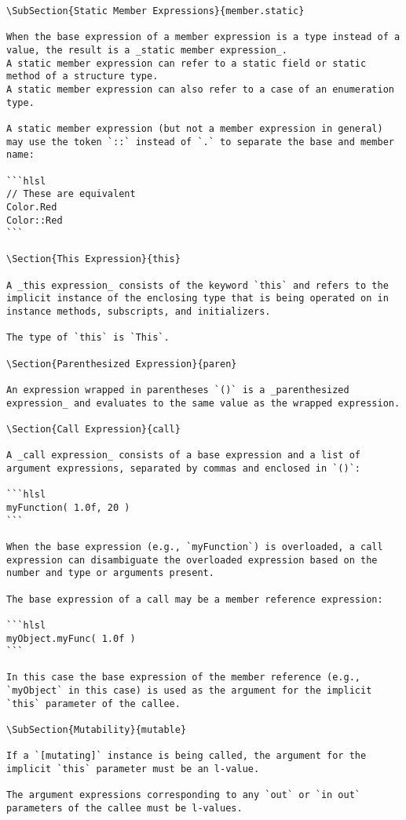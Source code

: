 \begin{verbatim}
\SubSection{Static Member Expressions}{member.static}

When the base expression of a member expression is a type instead of a value, the result is a _static member expression_.
A static member expression can refer to a static field or static method of a structure type.
A static member expression can also refer to a case of an enumeration type.

A static member expression (but not a member expression in general) may use the token `::` instead of `.` to separate the base and member name:

```hlsl
// These are equivalent
Color.Red
Color::Red
```

\Section{This Expression}{this}

A _this expression_ consists of the keyword `this` and refers to the implicit instance of the enclosing type that is being operated on in instance methods, subscripts, and initializers.

The type of `this` is `This`.

\Section{Parenthesized Expression}{paren}

An expression wrapped in parentheses `()` is a _parenthesized expression_ and evaluates to the same value as the wrapped expression.

\Section{Call Expression}{call}

A _call expression_ consists of a base expression and a list of argument expressions, separated by commas and enclosed in `()`:

```hlsl
myFunction( 1.0f, 20 )
```

When the base expression (e.g., `myFunction`) is overloaded, a call expression can disambiguate the overloaded expression based on the number and type or arguments present.

The base expression of a call may be a member reference expression:

```hlsl
myObject.myFunc( 1.0f )
```

In this case the base expression of the member reference (e.g., `myObject` in this case) is used as the argument for the implicit `this` parameter of the callee.

\SubSection{Mutability}{mutable}

If a `[mutating]` instance is being called, the argument for the implicit `this` parameter must be an l-value.

The argument expressions corresponding to any `out` or `in out` parameters of the callee must be l-values.


\end{verbatim}
